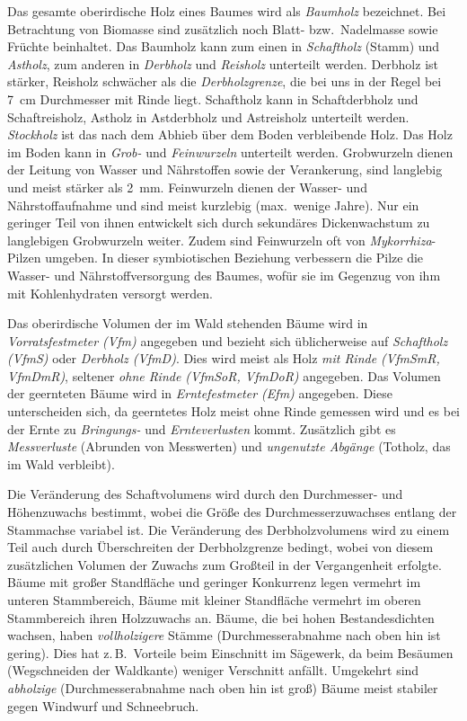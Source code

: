 \documentclass[twocolumn, paper=a4, fontsize=10pt]{scrartcl}
\begin{document}
Das gesamte oberirdische Holz eines Baumes wird als
\emph{Baumholz} bezeichnet. Bei Betrachtung von Biomasse sind
zusätzlich noch Blatt- bzw.\ Nadelmasse sowie Früchte beinhaltet. Das Baumholz
kann zum einen in \emph{Schaftholz} (Stamm) und
\emph{Astholz}, zum anderen in \emph{Derbholz}
und \emph{Reisholz} unterteilt werden. Derbholz ist stärker,
Reisholz schwächer als die \emph{Derbholzgrenze}, die bei
uns in der Regel bei \qty{7}{\cm} Durchmesser mit Rinde liegt. Schaftholz kann in Schaftderbholz
und Schaftreisholz, Astholz in Astderbholz und Astreisholz unterteilt werden.
\emph{Stockholz} ist das nach dem Abhieb über dem Boden
verbleibende Holz. Das Holz im Boden kann in \emph{Grob-}
und \emph{Feinwurzeln} unterteilt werden. Grobwurzeln dienen
der Leitung von Wasser und Nährstoffen sowie der Verankerung, sind langlebig und
meist stärker als \qty{2}{\mm}. Feinwurzeln dienen der Wasser- und Nährstoffaufnahme und sind meist kurzlebig (max.\ wenige Jahre). Nur ein geringer Teil von ihnen entwickelt sich durch sekundäres Dickenwachstum zu langlebigen Grobwurzeln weiter. Zudem sind Feinwurzeln oft von \emph{Mykorrhiza}-Pilzen umgeben. In dieser symbiotischen Beziehung verbessern die Pilze die Wasser- und Nährstoffversorgung des Baumes, wofür sie im Gegenzug von ihm mit Kohlenhydraten versorgt werden.

Das oberirdische Volumen der im Wald stehenden Bäume wird in
\emph{Vorratsfestmeter (Vfm)}
angegeben und bezieht sich üblicherweise auf \emph{Schaftholz (VfmS)} oder
\emph{Derbholz (VfmD)}. Dies wird meist als Holz \emph{mit Rinde (VfmSmR,
VfmDmR)}, seltener \emph{ohne Rinde (VfmSoR, VfmDoR)} angegeben. Das Volumen der
geernteten Bäume wird in
\emph{Erntefestmeter (Efm)}
angegeben. Diese unterscheiden sich, da geerntetes Holz meist ohne Rinde
gemessen wird und es bei der Ernte zu \emph{Bringungs-} und
\emph{Ernteverlusten} kommt. Zusätzlich gibt es
\emph{Messverluste} (Abrunden von Messwerten) und \emph{ungenutzte Abgänge}
(Totholz, das im Wald verbleibt).

Die Veränderung des Schaftvolumens wird durch den Durchmesser- und Höhenzuwachs
bestimmt, wobei die Größe des Durchmesserzuwachses entlang der Stammachse
variabel ist. Die Veränderung des Derbholzvolumens wird zu einem Teil auch
durch Überschreiten der Derbholzgrenze bedingt, wobei von diesem zusätzlichen
Volumen der Zuwachs zum Großteil in der Vergangenheit erfolgte. Bäume mit großer
Standfläche und geringer Konkurrenz legen vermehrt im unteren Stammbereich,
Bäume mit kleiner Standfläche vermehrt im oberen Stammbereich ihren Holzzuwachs
an. Bäume, die bei hohen Bestandesdichten wachsen, haben
\emph{vollholzigere} Stämme (Durchmesserabnahme nach oben hin
ist gering). Dies hat z.\,B.\ Vorteile beim Einschnitt im Sägewerk, da beim
Besäumen (Wegschneiden der Waldkante) weniger Verschnitt anfällt. Umgekehrt sind
\emph{abholzige} (Durchmesserabnahme nach oben hin ist groß)
Bäume meist stabiler gegen Windwurf und Schneebruch.
\end{document}
